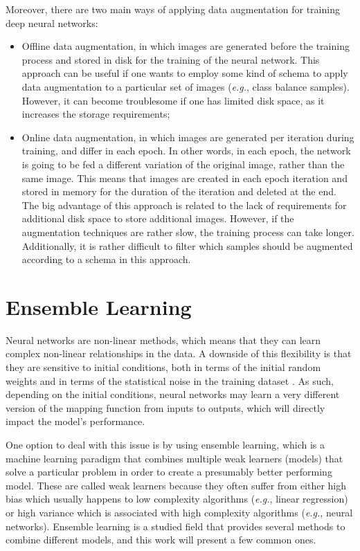     Moreover, there are two main ways of applying data augmentation for training deep neural networks:
    \begin{itemize}
        \item Offline data augmentation, in which images are generated before the training process and stored in disk for the training of the neural network. This approach can be useful if one wants to employ some kind of schema to apply data augmentation to a particular set of images (\textit{e.g.}, class balance samples). However, it can become troublesome if one has limited disk space, as it increases the storage requirements;
        \item Online data augmentation, in which images are generated per iteration during training, and differ in each epoch. In other words, in each epoch, the network is going to be fed a different variation of the original image, rather than the same image. This means that images are created in each epoch iteration and stored in memory for the duration of the iteration and deleted at the end. The big advantage of this approach is related to the lack of requirements for additional disk space to store additional images. However, if the augmentation techniques are rather slow, the training process can take longer. Additionally, it is rather difficult to filter which samples should be augmented according to a schema in this approach. 
    \end{itemize}

\section{Ensemble Learning}
\label{section:ensemble_learning}
    Neural networks are non-linear methods, which means that they can learn complex non-linear relationships in the data. A downside of this flexibility is that they are sensitive to initial conditions, both in terms of the initial random weights and in terms of the statistical noise in the training dataset \cite{Brownlee}. As such, depending on the initial conditions, neural networks may learn a very different version of the mapping function from inputs to outputs, which will directly impact the model's performance. \par
    
    One option to deal with this issue is by using ensemble learning, which is a machine learning paradigm that combines multiple weak learners (models) that solve a particular problem in order to create a presumably better performing model. These are called weak learners because they often suffer from either high bias which usually happens to low complexity algorithms (\textit{e.g.}, linear regression) or high variance which is associated with high complexity algorithms (\textit{e.g.}, neural networks). Ensemble learning is a studied field that provides several methods to combine different models, and this work will present a few common ones. \par

